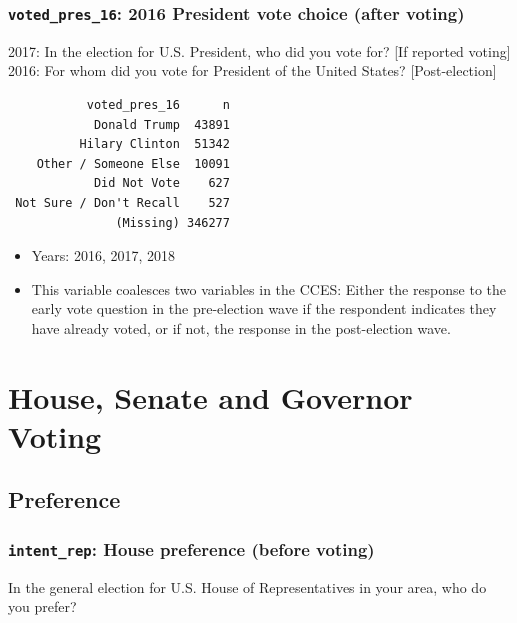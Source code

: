 \documentclass[10pt,article,oneside]{memoir}
\theoremstyle{definition}
\begin{document}
\subsubsection{\texorpdfstring{\texttt{voted\_pres\_16}: 2016 President
vote choice (after
voting)}{voted\_pres\_16: 2016 President vote choice (after voting)}}\label{voted_pres_16-2016-president-vote-choice-after-voting}

2017: In the election for U.S. President, who did you vote for? {[}If
reported voting{]} 2016: For whom did you vote for President of the
United States? {[}Post-election{]}

\begin{verbatim}
           voted_pres_16      n
            Donald Trump  43891
          Hilary Clinton  51342
    Other / Someone Else  10091
            Did Not Vote    627
 Not Sure / Don't Recall    527
               (Missing) 346277
\end{verbatim}

\begin{itemize}
\tightlist
\item
  Years: 2016, 2017, 2018
\item
  This variable coalesces two variables in the CCES: Either the response
  to the early vote question in the pre-election wave if the respondent
  indicates they have already voted, or if not, the response in the
  post-election wave.
\end{itemize}

\section{House, Senate and Governor
Voting}\label{house-senate-and-governor-voting}

\subsection{Preference}\label{preference}

\subsubsection{\texorpdfstring{\texttt{intent\_rep}: House preference
(before
voting)}{intent\_rep: House preference (before voting)}}\label{intent_rep-house-preference-before-voting}

In the general election for U.S. House of Representatives in your area,
who do you prefer?
\end{document}
